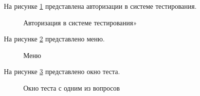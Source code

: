На рисунке \ref{authorisation:image} представлена авторизации в системе тестирования.
\begin{figure}[H] %
\caption{Авторизация в системе тестирования»}
\label{authorisation:image}
\end{figure}

На рисунке \ref{menu1:image} представлено меню.

\begin{figure}[H]
\caption{Меню}
\label{menu1:image}
\end{figure}

На рисунке \ref{test:image} представлено окно теста.

\begin{figure}[H]
\caption{Окно теста с одним из вопросов}
\label{test:image}
\end{figure}
